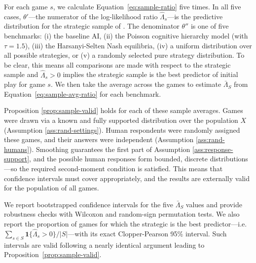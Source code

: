 For each game $s$, we calculate Equation~\ref{eq:sample-ratio} five times.
In all five cases, $\theta'$---the numerator of the log-likelihood ratio $\hat \Lambda_s$---is the predictive distribution for the strategic sample of .
The denominator $\theta''$ is one of five benchmarks: (i) the baseline AI, (ii) the Poisson cognitive hierarchy model (with $\tau = 1.5$), (iii) the Harsanyi-Selten Nash equilibria, (iv) a uniform distribution over all possible strategies, or (v) a randomly selected pure strategy distribution.
To be clear, this means all comparisons are made with respect to the strategic sample and $\hat \Lambda_s > 0$ implies the strategic sample is the best predictor of initial play for game $s$.
We then take the average across the games to estimate $\bar \Lambda_S$ from Equation~\ref{eq:sample-avg-ratio} for each benchmark.

Proposition \ref{prop:sample-valid} holds for each of these sample averages.
Games were drawn via a known and fully supported distribution over the population $X$ (Assumption \ref{ass:rand-settings}).
Human respondents were randomly assigned these games, and their answers were independent (Assumption \ref{ass:rand-humans}).
Smoothing guarantees the first part of Assumption \ref{ass:response-support}, and the possible human responses form bounded, discrete distributions---so the required second-moment condition is satisfied.
This means that confidence intervals must cover appropriately, and the results are externally valid for the population of all \TotalGames{} games.

We report bootstrapped confidence intervals for the five $\bar\Lambda_S$ values and provide robustness checks with Wilcoxon and random-sign permutation tests.
We also report the proportion of games for which the strategic \aisub{} is the best predictor---i.e. $\sum_{s \in S} \mathbf 1\{\hat \Lambda_s > 0\} / |S|$---with its exact Clopper-Pearson 95\% interval.
Such intervals are valid following a nearly identical argument leading to Proposition~\ref{prop:sample-valid}.
